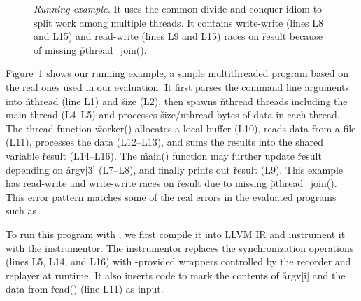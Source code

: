 
\begin{figure}[t]
\centering
\begin{minipage}{.5\textwidth}
\end{minipage}
\caption{{\em Running example.} It uses the common
  divide-and-conquer idiom to split work among multiple threads.
  It contains write-write (lines L8 and L15)
  and read-write (lines L9 and L15) races on \v{result} because
  of missing \v{pthread\_join()}.} \label{fig:example}
\end{figure}

Figure~\ref{fig:example} shows our running example, a simple multithreaded
program based on the real ones used in our evaluation.  It first parses
the command line arguments into \v{nthread} (line L1) and \v{size} (L2),
then spawns \v{nthread} threads including the main thread (L4--L5) and
processes \v{size/nthread} bytes of data in each thread.  The thread
function \v{worker()} allocates a local buffer (L10), reads data from a
file (L11), processes the data (L12--L13), and sums the results into
the shared variable \v{result} (L14--L16).  The \v{main()} function may
further update \v{result} depending on \v{argv[3]} (L7--L8), and finally
prints out \v{result} (L9).  This example has read-write and write-write
races on \v{result} due to missing \v{pthread\_join()}.  This error
pattern matches some of the real errors in the evaluated programs such as
\pbzip.

 To run this
program with \peregrine, we first compile it into LLVM IR and instrument it with
the instrumentor.  The instrumentor replaces the synchronization
operations (lines L5, L14, and L16) with \peregrine-provided wrappers controlled by
the recorder and replayer at runtime.  It also inserts code to mark 
the contents of \v{argv[i]} and the data from \v{read()} (line L11) as
input.

